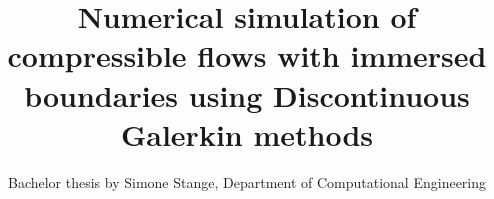 	\title{Numerical simulation of compressible flows with immersed boundaries using Discontinuous Galerkin methods}
	\subtitle{Bachelor thesis by Simone Stange, Department of Computational Engineering}
	
